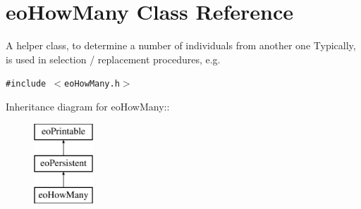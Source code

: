 \section{eo\-How\-Many Class Reference}
\label{classeo_how_many}
A helper class, to determine a number of individuals from another one Typically, is used in selection / replacement procedures, e.g.  


{\tt \#include $<$eo\-How\-Many.h$>$}

Inheritance diagram for eo\-How\-Many::\begin{figure}[H]
\begin{center}
\leavevmode
\includegraphics[height=3cm]{classeo_how_many}
\end{center}
\end{figure}
